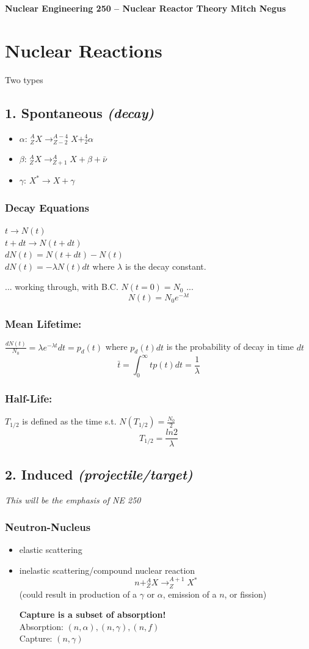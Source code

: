\documentclass{report}
\newcommand{\h}[1]{\section*{#1}}
\newcommand{\hh}[1]{\subsection*{#1}}
\newcommand{\hhh}[1]{\subsubsection*{#1}}
\begin{document}
\thispagestyle{empty}

{\bf {\large {Nuclear Engineering 250 -- Nuclear Reactor Theory \hfill Mitch Negus}}}


\h{Nuclear Reactions}

Two types


\hh{1. Spontaneous \textsl{(decay)}}

\begin{itemize}
    \item $\alpha$: $^A_ZX \rightarrow ^{A-4}_{Z-2}X + ^4_2\alpha$
    \item $\beta$: $^A_ZX \rightarrow ^A_{Z+1}X + \beta + \bar{\nu}$
    \item $\gamma$: $X^* \rightarrow X + \gamma$
\end{itemize}

\hhh{Decay Equations}
\begin{multicols}{2}
$ t \rightarrow N(t) $\\
$ t+dt \rightarrow N(t+dt) $\\
$dN(t) = N(t+dt) - N(t) $\\
$dN(t) = -\lambda N(t) dt$ where $\lambda$ is the decay constant.
\end{multicols}
... working through, with B.C. $N(t=0) = N_0$ ...
$$N(t) = N_0 e^{-\lambda t}$$

\hhh{Mean Lifetime:}
$\frac{dN(t)}{N_0} = \lambda e^{-\lambda t} dt = p_d(t)$ where $p_d(t) dt$ is the probability of decay in time $dt$
$$\bar{t} = \int_0^{\infty} t p(t) dt = \frac{1}{\lambda}$$

\hhh{Half-Life:}
$T_{1/2}$ is defined as the time s.t. $N(T_{1/2}) = \frac{N_0}{2}$
$$T_{1/2} = \frac{ln2}{\lambda}$$


\hh{2. Induced \textsl{(projectile/target)}}
\textsl{This will be the emphasis of NE 250}

\hhh{ Neutron-Nucleus}

\begin{itemize}
    \item elastic scattering
    \item inelastic scattering/compound nuclear reaction  
    $$n + ^A_ZX \rightarrow ^{A+1}_ZX^*$$
	(could result in production of a $\gamma$ or $\alpha$, emission of a $n$, or fission)
	
	\textbf{Capture is a subset of absorption!}\\
	Absorption: $(n,\alpha), (n,\gamma), (n,f)$\\
	Capture: $(n,\gamma)$
\end{itemize}
	
\end{document}

